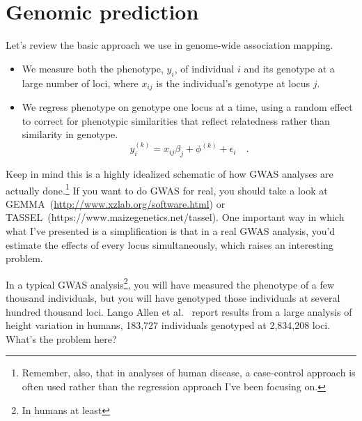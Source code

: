 \chapter{Genomic prediction}

Let's review the basic approach we use in genome-wide association
mapping.

\begin{itemize}

\item We measure both the phenotype, $y_i$, of individual $i$ and its
  genotype at a large number of loci, where $x_{ij}$ is the
  individual's genotype at locus $j$.

\item We regress phenotype on genotype one locus at a time, using a
  random effect to correct for phenotypic similarities that reflect
  relatedness rather than similarity in genotype. 
\[
y_i^{(k)} = x_{ij}\beta_j + \phi^{(k)} + \epsilon_i \quad .
\]

\end{itemize}

Keep in mind this is a highly idealized schematic of how GWAS analyses
are actually done.\footnote{Remember, also, that in analyses of human
  disease, a case-control approach is often used rather than the
  regression approach I've been focusing on.} If you want to do GWAS
for real, you should take a look at
GEMMA~(\url{http://www.xzlab.org/software.html}) or
TASSEL~(https://www.maizegenetics.net/tassel). One
important way in which what I've presented is a simplification is that
in a real GWAS analysis, you'd estimate the effects of every locus
simultaneously, which raises an interesting problem.

In a typical GWAS analysis\footnote{In humans at least}, you will have
measured the phenotype of a few thousand individuals, but you will
have genotyped those individuals at several hundred thousand
loci. Lango Allen et al.~\cite{LangoAllen-etal-2010} report results
from a large analysis of height variation in humans, 183,727
individuals genotyped at 2,834,208 loci. What's the problem here?

